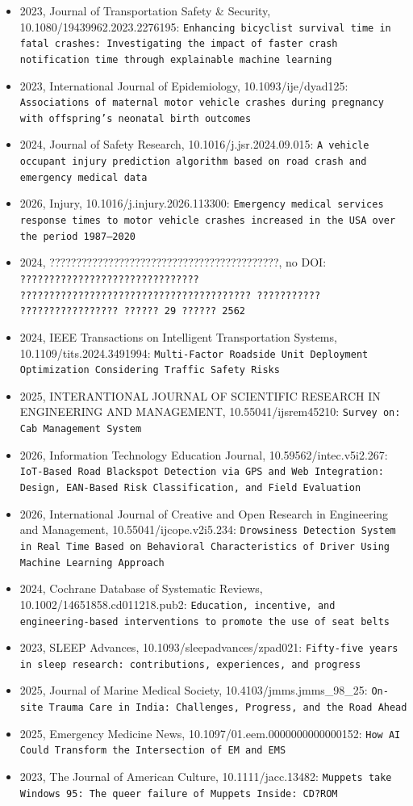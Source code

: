 \begin{itemize}
\item 2023, Journal of Transportation Safety \& Security, 10.1080/19439962.2023.2276195: \texttt{Enhancing bicyclist survival time in fatal crashes: Investigating the impact of faster crash notification time through explainable machine learning}
\item 2023, International Journal of Epidemiology, 10.1093/ije/dyad125: \texttt{Associations of maternal motor vehicle crashes during pregnancy with offspring's neonatal birth outcomes}
\item 2024, Journal of Safety Research, 10.1016/j.jsr.2024.09.015: \texttt{A vehicle occupant injury prediction algorithm based on road crash and emergency medical data}
\item 2026, Injury, 10.1016/j.injury.2026.113300: \texttt{Emergency medical services response times to motor vehicle crashes increased in the USA over the period 1987--2020}
\item 2024, ???????????????????????????????????????????, no DOI: \texttt{??????????????????????????????? ???????????????????????????????????????? ??????????? ????????????????? ?????? 29 ?????? 2562}
\item 2024, IEEE Transactions on Intelligent Transportation Systems, 10.1109/tits.2024.3491994: \texttt{Multi-Factor Roadside Unit Deployment Optimization Considering Traffic Safety Risks}
\item 2025, INTERANTIONAL JOURNAL OF SCIENTIFIC RESEARCH IN ENGINEERING AND MANAGEMENT, 10.55041/ijsrem45210: \texttt{Survey on: Cab Management System}
\item 2026, Information Technology Education Journal, 10.59562/intec.v5i2.267: \texttt{IoT-Based Road Blackspot Detection via GPS and Web Integration: Design, EAN-Based Risk Classification, and Field Evaluation}
\item 2026, International Journal of Creative and Open Research in Engineering and Management, 10.55041/ijcope.v2i5.234: \texttt{Drowsiness Detection System in Real Time Based on Behavioral Characteristics of Driver Using Machine Learning Approach}
\item 2024, Cochrane Database of Systematic Reviews, 10.1002/14651858.cd011218.pub2: \texttt{Education, incentive, and engineering-based interventions to promote the use of seat belts}
\item 2023, SLEEP Advances, 10.1093/sleepadvances/zpad021: \texttt{Fifty-five years in sleep research: contributions, experiences, and progress}
\item 2025, Journal of Marine Medical Society, 10.4103/jmms.jmms\_98\_25: \texttt{On-site Trauma Care in India: Challenges, Progress, and the Road Ahead}
\item 2025, Emergency Medicine News, 10.1097/01.eem.0000000000000152: \texttt{How AI Could Transform the Intersection of EM and EMS}
\item 2023, The Journal of American Culture, 10.1111/jacc.13482: \texttt{Muppets take Windows 95: The queer failure of Muppets Inside: CD?ROM}
\end{itemize}

